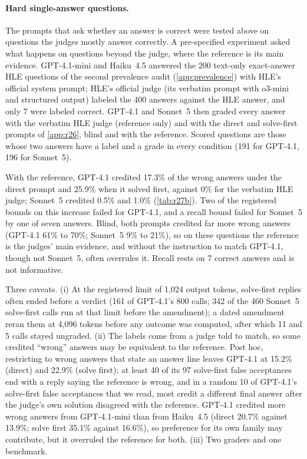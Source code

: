 \paragraph{Hard single-answer questions.} The prompts that ask whether an answer is correct were tested above on questions the judges mostly answer correctly. A pre-specified experiment asked what happens on questions beyond the judge, where the reference is its main evidence. GPT-4.1-mini and Haiku~4.5 answered the 200 text-only exact-answer HLE questions of the second prevalence audit (\cref{app:prevalence}) with HLE's official system prompt; HLE's official judge (its verbatim prompt with o3-mini and structured output) labeled the 400 answers against the HLE answer, and only 7 were labeled correct. GPT-4.1 and Sonnet~5 then graded every answer with the verbatim HLE judge (reference only) and with the direct and solve-first prompts of \cref{app:r26}, blind and with the reference. Scored questions are those whose two answers have a label and a grade in every condition (191 for GPT-4.1, 196 for Sonnet~5).

With the reference, GPT-4.1 credited 17.3\% of the wrong answers under the direct prompt and 25.9\% when it solved first, against 0\% for the verbatim HLE judge; Sonnet~5 credited 0.5\% and 1.0\% (\cref{tab:r27b}). Two of the registered bounds on this increase failed for GPT-4.1, and a recall bound failed for Sonnet~5 by one of seven answers. Blind, both prompts credited far more wrong answers (GPT-4.1 61\% to 70\%; Sonnet~5 9\% to 21\%), so on these questions the reference is the judges' main evidence, and without the instruction to match GPT-4.1, though not Sonnet~5, often overrules it. Recall rests on 7 correct answers and is not informative.

Three caveats. (i) At the registered limit of 1,024 output tokens, solve-first replies often ended before a verdict (161 of GPT-4.1's 800 calls; 342 of the 460 Sonnet~5 solve-first calls run at that limit before the amendment); a dated amendment reran them at 4,096 tokens before any outcome was computed, after which 11 and 5 calls stayed ungraded. (ii) The labels come from a judge told to match, so some credited ``wrong'' answers may be equivalent to the reference. Post hoc, restricting to wrong answers that state an answer line leaves GPT-4.1 at 15.2\% (direct) and 22.9\% (solve first); at least 40 of its 97 solve-first false acceptances end with a reply saying the reference is wrong, and in a random 10 of GPT-4.1's solve-first false acceptances that we read, most credit a different final answer after the judge's own solution disagreed with the reference. GPT-4.1 credited more wrong answers from GPT-4.1-mini than from Haiku~4.5 (direct 20.7\% against 13.9\%; solve first 35.1\% against 16.6\%), so preference for its own family may contribute, but it overruled the reference for both.\ph{} (iii) Two graders and one benchmark.

